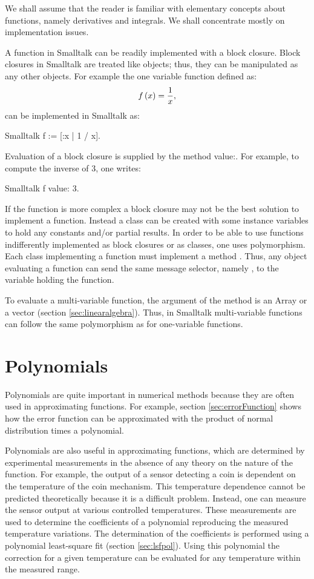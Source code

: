We shall assume that the reader is familiar with elementary
concepts about functions, namely derivatives and integrals. We
shall concentrate mostly on implementation issues.

A function in Smalltalk can be readily implemented with a block closure. Block closures in
Smalltalk are treated like objects; thus, they can be manipulated
as any other objects. For example the one variable function
defined as:
\begin{equation}
f\left( x \right)={1 \over x},
\end{equation}
can be implemented in Smalltalk as:
\begin{displaycode}{Smalltalk}
f := [:x | 1 / x].
\end{displaycode}
Evaluation of a block closure is supplied by the method value:.
For example, to compute the inverse of 3, one writes:
\begin{displaycode}{Smalltalk}
f value: 3.
\end{displaycode}

If the function is more complex a block closure may not be the
best solution to implement a function. Instead a class can be
created with some instance variables to hold any constants and/or
partial results. In order to be able to use functions
indifferently implemented as block closures or as classes, one
uses polymorphism. Each class implementing a function must
implement a method .
Thus, any object evaluating a function can send the same message selector, namely , to the variable
holding the function.

To evaluate a multi-variable function, the argument of the method
 is an Array or a vector (\cf section
\ref{sec:linearalgebra}). Thus, in Smalltalk multi-variable
functions can follow the same polymorphism as for one-variable
functions.

\section{Polynomials}
\label{sec:polynomial}
 Polynomials are quite important in
numerical methods because they are often used in approximating
functions. For example, section \ref{sec:errorFunction} shows how
the error function can be approximated with the product of normal
distribution times a polynomial.

Polynomials are also useful in approximating functions, which are
determined by experimental measurements in the absence of any
theory on the nature of the function. For example, the output of a
sensor detecting a coin is dependent on the temperature of the
coin mechanism. This temperature dependence cannot be predicted
theoretically because it is a difficult problem. Instead, one can
measure the sensor output at various controlled temperatures.
These measurements are used to determine the coefficients of a
polynomial reproducing the measured temperature variations. The
determination of the coefficients is performed using a polynomial
least-square fit (\cf section \ref{sec:lsfpol}). Using this
polynomial the correction for a given temperature can be evaluated
for any temperature within the measured range.

